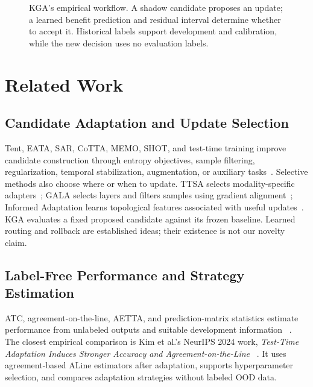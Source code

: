 \begin{figure}[t]
  \centering
  \caption{KGA's empirical workflow. A shadow candidate proposes an update; a learned benefit
  prediction and residual interval determine whether to accept it. Historical labels support
  development and calibration, while the new decision uses no evaluation labels.}
  \label{fig:compact-flow}
\end{figure}

\section{Related Work}
\label{sec:compact-related}

\subsection{Candidate Adaptation and Update Selection}

Tent, EATA, SAR, CoTTA, MEMO, SHOT, and test-time training improve candidate construction through
entropy objectives, sample filtering, regularization, temporal stabilization, augmentation, or
auxiliary tasks~\cite{wang2021tent,niu2022eata,niu2023sar,wang2022cotta,zhang2022memo,
liang2020shot,sun2020ttt}. Selective methods also choose where or when to update. TTSA selects
modality-specific adapters~\cite{chen2025ttsa}; GALA selects layers and filters samples using
gradient alignment~\cite{sahoo2025gala}; Informed Adaptation learns topological features associated
with useful updates~\cite{mutlu2026informed}. KGA evaluates a fixed proposed candidate against its
frozen baseline. Learned routing and rollback are established ideas; their existence is not our
novelty claim.

\subsection{Label-Free Performance and Strategy Estimation}

ATC, agreement-on-the-line, AETTA, and prediction-matrix statistics estimate performance from
unlabeled outputs and suitable development information
~\cite{garg2022atc,baek2022aol,miller2021aol,lee2024aetta,deng2023confidence,xie2024mano}.
The closest empirical comparison is Kim et al.'s NeurIPS 2024 work,
\emph{Test-Time Adaptation Induces Stronger Accuracy and Agreement-on-the-Line}
~\cite{kim2024ttaline}. It uses agreement-based ALine estimators after adaptation, supports
hyperparameter selection, and compares adaptation strategies without labeled OOD data.

